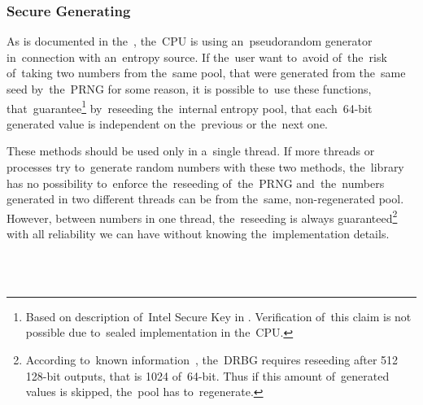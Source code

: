 \subsubsection{Secure Generating}\label{subsec:api:secure}
\par{
As is documented in the~, the~CPU is using an~pseudorandom generator in~connection with an~entropy source. If the~user want to~avoid of~the~risk of~taking two numbers from the~same pool, that were generated from the~same seed by~the~PRNG for some reason, it is possible to~use these functions, that~guarantee\footnote{Based on description of~Intel Secure Key in . Verification of~this claim is not possible due to~sealed implementation in the~CPU.} by~reseeding the~internal entropy pool, that each~64-bit generated value is independent on the~previous or the~next one. 
}

\par{
These methods should be used only in a~single thread. 
If more threads or processes try to~generate random numbers with these two methods, 
the~library has no possibility to~enforce the~reseeding of~the~PRNG and~the~numbers generated 
in two different threads can be from the~same, non-regenerated pool.
However, between numbers in one thread, 
the~reseeding is always guaranteed\footnote{According to~known information~\cite[sec.~2.4.2]{AnalysisOfDRNG}, the~DRBG requires reseeding after 512 128-bit outputs, that is 1024 of~64-bit. 
Thus if this amount of~generated values is skipped, the~pool has to~regenerate.} 
with all reliability we can have without knowing the~implementation details.
}



\\


\\


